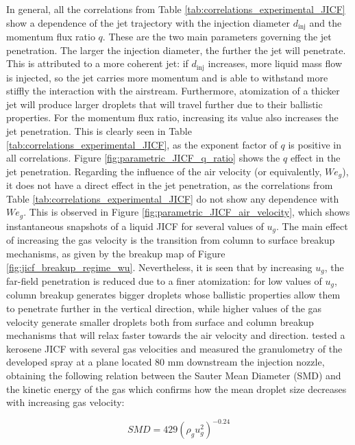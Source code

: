 In general, all the correlations from Table \ref{tab:correlations_experimental_JICF} show a dependence of the jet trajectory with the injection diameter $d_\mathrm{inj}$ and the momentum flux ratio $q$. These are the two main parameters governing the jet penetration. The larger the injection diameter, the further the jet will penetrate. This is attributed to a more coherent jet: if $d_\mathrm{inj}$ increases, more liquid mass flow is injected, so the jet carries more momentum and is able to withstand more stiffly the
interaction with the airstream. Furthermore, atomization of a thicker jet will produce larger droplets that
will travel further due to their ballistic properties. For the momentum flux ratio, increasing its value also increases the jet penetration. This is clearly seen in Table \ref{tab:correlations_experimental_JICF}, as the exponent factor of $q$ is positive in all correlations. Figure \ref{fig:parametric_JICF_q_ratio} shows the $q$ effect in the jet penetration. Regarding the influence of the air velocity (or equivalently, $We_g$), it does not have a direct effect in the jet penetration, as the correlations from Table \ref{tab:correlations_experimental_JICF} do not show any dependence with $We_g$. This is observed in Figure \ref{fig:parametric_JICF_air_velocity}, which shows instantaneous snapshots of a liquid JICF for several values of $u_g$. The main effect of increasing the gas velocity is the transition from column to surface breakup mechanisms, as given by the breakup map of Figure \ref{fig:jicf_breakup_regime_wu}. Nevertheless, it is seen that by increasing $u_g$, the far-field penetration is reduced due to a finer atomization: for low values of $u_g$, column breakup generates bigger droplets whose ballistic properties allow them to penetrate further in the vertical direction, while higher values of the gas velocity generate smaller droplets both from surface and column breakup mechanisms that will relax faster towards the air velocity and direction.  tested a kerosene JICF with several gas velocities and measured the granulometry of the developed spray at a plane located 80 mm downstream the injection nozzle, obtaining the following relation between the Sauter Mean Diameter (SMD) and the kinetic energy of the gas which confirms how the mean droplet size decreases with increasing gas velocity:

\begin{equation}
SMD = 429 \left( \rho_g u_g^2 \right)^{-0.24}
\end{equation}



